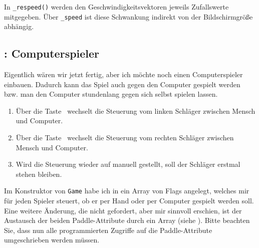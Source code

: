 
In \texttt{\_respeed()} werden den Geschwindigkeitsvektoren jeweils Zufallswerte mitgegeben. Über \texttt{\_speed} ist diese Schwankung indirekt von der Bildschirmgröße abhängig. 



\subsection{: Computerspieler}

Eigentlich wären wir jetzt fertig, aber ich möchte noch einen Computerspieler einbauen. Dadurch kann das Spiel auch gegen den Computer gespielt werden bzw. man den Computer stundenlang gegen sich selbst spielen lassen.

\begin{enumerate}
	\item Über die Taste~ wechselt die Steuerung vom linken Schläger zwischen Mensch und Computer.\label{req0201Computer1}

	\item Über die Taste~ wechselt die Steuerung vom rechten Schläger zwischen Mensch und Computer.\label{req0201Computer2}
	
	\item Wird die Steuerung wieder auf manuell gestellt, soll der Schläger erstmal stehen bleiben.\label{req0201ComputerHalt}
\end{enumerate}
\er

Im Konstruktor von \texttt{Game} habe ich in  ein Array von Flags angelegt, welches mir für jeden Spieler steuert, ob er per Hand oder per Computer gespielt werden soll. Eine weitere Änderung, die nicht gefordert, aber mir sinnvoll erschien, ist der Austausch der beiden Paddle-Attribute durch ein Array (siehe ). Bitte beachten Sie, dass nun alle programmierten Zugriffe auf die Paddle-Attribute umgeschrieben werden müssen.



